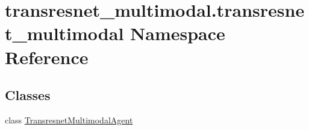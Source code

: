 \hypertarget{namespacetransresnet__multimodal_1_1transresnet__multimodal}{}\section{transresnet\+\_\+multimodal.\+transresnet\+\_\+multimodal Namespace Reference}
\label{namespacetransresnet__multimodal_1_1transresnet__multimodal}
\subsection*{Classes}
\begin{DoxyCompactItemize}
\item 
class \hyperlink{classtransresnet__multimodal_1_1transresnet__multimodal_1_1TransresnetMultimodalAgent}{Transresnet\+Multimodal\+Agent}
\end{DoxyCompactItemize}
